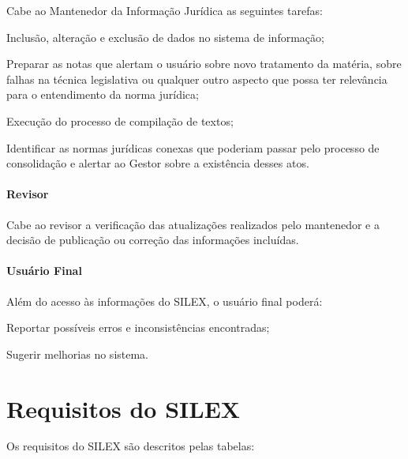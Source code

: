 \documentclass[a4paper,11pt,openright,twoside,english,brazil]{abntex2}
\begin{document}
Cabe ao Mantenedor da Informação Jurídica as seguintes tarefas:

\begin{alineas}
 \item Inclusão, alteração e exclusão de dados no sistema de informação;
 \item Preparar as notas que alertam o usuário sobre novo tratamento da matéria,
 sobre falhas na técnica legislativa ou qualquer outro aspecto que possa ter
 relevância para o entendimento da norma jurídica;
 \item Execução do processo de compilação de textos;
 \item Identificar as normas jurídicas conexas que poderiam passar pelo processo
 de consolidação e alertar ao Gestor sobre a existência desses atos.
\end{alineas}

\subsubsection{Revisor}
\label{sec-papel-revisor}

Cabe ao revisor a verificação das atualizações realizados pelo mantenedor e a
decisão de publicação ou correção das informações incluídas.

\subsubsection{Usuário Final}
\label{sec-papel-usuario-final}

Além do acesso às informações do SILEX, o usuário final poderá:

\begin{alineas}
 \item Reportar possíveis erros e inconsistências encontradas;
 \item Sugerir melhorias no sistema.
\end{alineas}

\chapter{Requisitos do SILEX}
\label{cap_requisitos}

Os requisitos do SILEX são descritos pelas tabelas:

\silextabelasrequisitos
\end{document}
